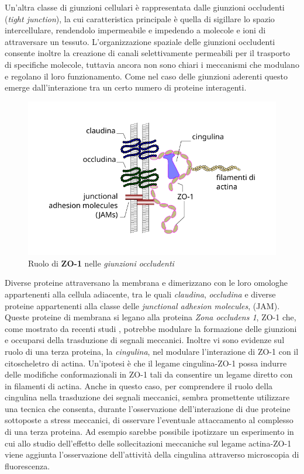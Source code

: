 \vspace{1em}
Un'altra classe di giunzioni cellulari è rappresentata dalle
giunzioni occludenti (\textit{tight junction}), la cui caratteristica
principale è quella di sigillare lo spazio intercellulare, rendendolo
impermeabile e impedendo a molecole e ioni di attraversare un
tessuto.
L'organizzazione spaziale delle giunzioni occludenti consente inoltre
la creazione di canali selettivamente permeabili per il trasporto
di specifiche molecole, tuttavia ancora non sono chiari i meccanismi
che modulano e regolano il loro funzionamento.
Come nel caso delle giunzioni aderenti questo emerge dall'interazione
tra un certo numero di proteine interagenti.

\begin{figure}[ht]
    \centering
    \includegraphics{images/tj.pdf}
    \caption{Ruolo di \textbf{ZO-1} nelle \emph{giunzioni occludenti}}
    \label{fig:tj}
\end{figure}

Diverse proteine attraversano la membrana e dimerizzano
con le loro omologhe appartenenti alla cellula adiacente,
tra le quali \emph{claudina}, \emph{occludina} e diverse
proteine appartenenti alla classe delle \textit{junctional
adhesion molecules}, (JAM).
Queste proteine di membrana si legano alla proteina
\textit{Zona occludens 1}, ZO-1 che, come mostrato da
recenti studi \cite{??}, potrebbe modulare la formazione
delle giunzioni e occuparsi della trasduzione di segnali
meccanici.
Inoltre vi sono evidenze sul ruolo di una terza proteina,
la \textit{cingulina}, nel modulare l'interazione di ZO-1
con il citoscheletro di actina. Un'ipotesi è che il
legame cingulina-ZO-1 possa indurre delle modifiche
conformazionali in ZO-1 tali da consentire un legame
diretto con in filamenti di actina.
Anche in questo caso, per comprendere il ruolo della cingulina
nella trasduzione dei segnali meccanici, sembra promettente
utilizzare una tecnica che consenta, durante l'osservazione
dell'interazione di due proteine sottoposte a stress
meccanici, di osservare l'eventuale attaccamento al complesso
di una terza proteina. Ad esempio sarebbe possibile ipotizzare
un esperimento in cui allo studio dell'effetto delle sollecitazioni
meccaniche sul legame actina-ZO-1 viene aggiunta l'osservazione
dell'attività della cingulina attraverso microscopia di fluorescenza.



